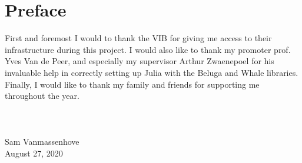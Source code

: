 
\chapter*{Preface}

First and foremost I would to thank the VIB for giving me access to their infrastructure during this project. I would also like to thank my promoter prof. Yves Van de Peer, and especially my supervisor Arthur Zwaenepoel for his invaluable help in correctly setting up Julia with the Beluga and Whale libraries. 
\\
Finally, I would like to thank my family and friends for supporting me throughout the year.
\\
\\
\\
\\
Sam Vanmassenhove \\
August 27, 2020

